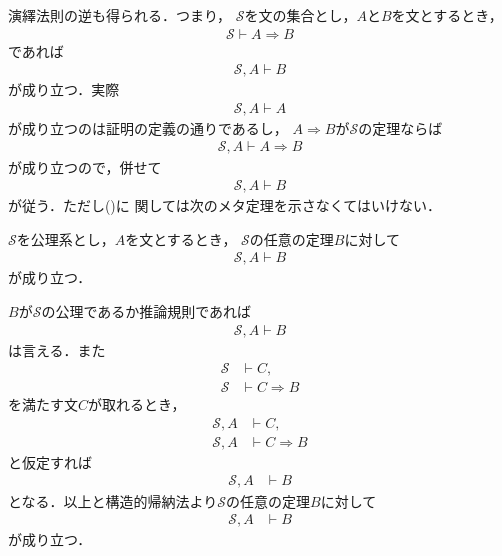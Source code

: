 	演繹法則の逆も得られる．つまり，
	$\mathscr{S}$を文の集合とし，$A$と$B$を文とするとき，
	\begin{align}
		\mathscr{S} \vdash A \Longrightarrow B
	\end{align}
	であれば
	\begin{align}
		\mathscr{S}, A \vdash B
	\end{align}
	が成り立つ．実際
	\begin{align}
		\mathscr{S}, A \vdash A
	\end{align}
	が成り立つのは証明の定義の通りであるし，
	$A \Longrightarrow B$が$\mathscr{S}$の定理ならば
	\begin{align}
		\mathscr{S}, A \vdash A \Longrightarrow B
		\label{fom:inversion_of_deduction_theorem}
	\end{align}
	が成り立つので，併せて
	\begin{align}
		\mathscr{S}, A \vdash B
	\end{align}
	が従う．ただし()に
	関しては次のメタ定理を示さなくてはいけない．
	
	\begin{screen}
		\begin{metathm}[公理が増えても証明可能]
			$\mathscr{S}$を公理系とし，$A$を文とするとき，
			$\mathscr{S}$の任意の定理$B$に対して
			\begin{align}
				\mathscr{S}, A \vdash B
			\end{align}
			が成り立つ．
		\end{metathm}
	\end{screen}
	
	\begin{metaprf}
		$B$が$\mathscr{S}$の公理であるか推論規則であれば
		\begin{align}
			\mathscr{S}, A \vdash B
		\end{align}
		は言える．また
		\begin{align}
			\mathscr{S} &\vdash C, \\
			\mathscr{S} &\vdash C \Longrightarrow B
		\end{align}
		を満たす文$C$が取れるとき，
		\begin{align}
			\mathscr{S}, A &\vdash C, \\
			\mathscr{S}, A &\vdash C \Longrightarrow B
		\end{align}
		と仮定すれば
		\begin{align}
			\mathscr{S}, A &\vdash B
		\end{align}
		となる．以上と構造的帰納法より$\mathscr{S}$の任意の定理$B$に対して
		\begin{align}
			\mathscr{S}, A &\vdash B
		\end{align}
		が成り立つ．
		\QED
	\end{metaprf}
	
